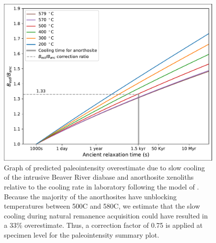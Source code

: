 \documentclass[9pt,twoside,lineno]{pnas-new}
\begin{document}
\begin{figure}[h!]
\noindent\includegraphics[width=17.8 cm]{Cooling_rate_correction.pdf}
\centering
\caption{{Graph of predicted paleointensity overestimate due to slow cooling of the intrusive Beaver River diabase and anorthosite xenoliths relative to the cooling rate in laboratory following the model of \citealp{Halgedahl1980a}. Because the majority of the anorthosites have unblocking temperatures between 500\textdegree C and 580\textdegree C, we estimate that the slow cooling during natural remanence acquisition could have resulted in a 33\% overestimate. Thus, a correction factor of 0.75 is applied at specimen level for the paleointensity summary plot.}}
\label{fig:PINT_cooling_corrected}
\end{figure}

\clearpage
\end{document}
